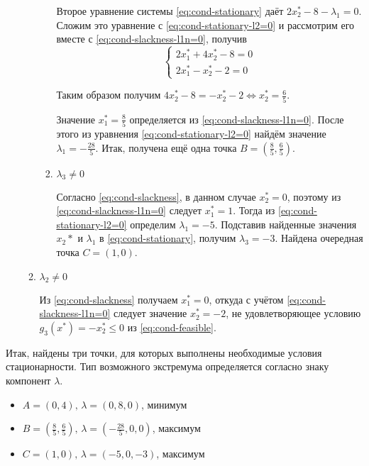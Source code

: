\documentclass{article}
\renewcommand{\leq}{\leqslant}
\numberwithin{equation}{section}
\begin{document}
\begin{enumerate}
\begin{enumerate}
\begin{enumerate}
      Второе уравнение системы \eqref{eq:cond-stationary} даёт
      $2x^*_2-8-\lambda_1=0$. Сложим это уравнение с
      \eqref{eq:cond-stationary-l2=0} и рассмотрим его вместе с
      \eqref{eq:cond-slackness-l1n=0}, получив
      \begin{equation}
        \begin{cases}
          2x^*_1+4x^*_2-8=0\\
          2x^*_1-x^*_2-2=0
        \end{cases}
      \end{equation}
      
      Таким образом получим $4x^*_2-8=-x^*_2-2 \iff x^*_2=\frac{6}{5}$.

      Значение $x^*_1=\frac{8}{5}$ определяется из
      \eqref{eq:cond-slackness-l1n=0}. После этого из уравнения
      \eqref{eq:cond-stationary-l2=0} найдём значение $\lambda_1 =
      -\frac{28}{5}$. Итак, получена ещё одна точка $B =
      \left(\frac{8}{5}, \frac{6}{5}\right)$.
    \item $\lambda_3 ≠ 0$

      Согласно \eqref{eq:cond-slackness}, в данном случае $x^*_2=0$,
      поэтому из \eqref{eq:cond-slackness-l1n=0} следует $x^*_1=1$.
      Тогда из \eqref{eq:cond-stationary-l2=0} определим $\lambda_1 =
      -5$. Подставив найденные значения $x_2*$ и $\lambda_1$ в
      \eqref{eq:cond-stationary}, получим $\lambda_3 = -3$. Найдена
      очередная точка $C=(1, 0)$.
    \end{enumerate}
  \item $\lambda_2 ≠ 0$

    Из \eqref{eq:cond-slackness} получаем $x^*_1=0$, откуда с учётом
    \eqref{eq:cond-slackness-l1n=0} следует значение $x^*_2=-2$, не
    удовлетворяющее условию $g_3(x^*) = -x^*_2 \leq 0$ из
    \eqref{eq:cond-feasible}.
  \end{enumerate}
\end{enumerate}

Итак, найдены три точки, для которых выполнены необходимые условия
стационарности. Тип возможного экстремума определяется согласно знаку
компонент $\lambda$.
\begin{itemize}
\item $A = (0, 4),\, \lambda=(0, 8, 0)$, минимум
\item $B = (\frac{8}{5}, \frac{6}{5}),\, \lambda=(-\frac{28}{5}, 0,
  0)$, максимум
\item $C = (1, 0),\, \lambda=(-5, 0, -3)$, максимум
\end{itemize}
\end{document}
